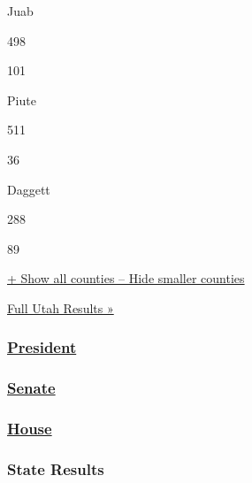 Juab

498

101

Piute

511

36

Daggett

288

89

\protect\hyperlink{}{+ Show all counties -- Hide smaller counties}

\href{https://www.nytimes3xbfgragh.onion/elections/2016/results/utah}{Full
Utah Results »}

\hypertarget{president}{%
\subsubsection{\texorpdfstring{\href{//www.nytimes3xbfgragh.onion/elections/2016/results/president}{President}}{President}}\label{president}}

\hypertarget{senate}{%
\subsubsection{\texorpdfstring{\href{//www.nytimes3xbfgragh.onion/elections/2016/results/senate}{Senate}}{Senate}}\label{senate}}

\hypertarget{house}{%
\subsubsection{\texorpdfstring{\href{//www.nytimes3xbfgragh.onion/elections/2016/results/house}{House}}{House}}\label{house}}

\hypertarget{state-results}{%
\subsubsection{State Results}\label{state-results}}

